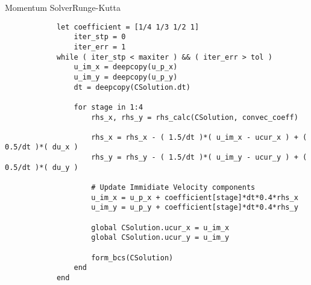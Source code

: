 \documentclass[\string~/GitHub/sthlmNordBeamerTheme/sthlmNordLightDemo.tex]{subfiles}
\begin{document}
\begin{frame}{Momentum Solver}{Runge-Kutta}

    \begin{center}
        \begin{verbatim}
            let coefficient = [1/4 1/3 1/2 1]
                iter_stp = 0
                iter_err = 1
            while ( iter_stp < maxiter ) && ( iter_err > tol )
                u_im_x = deepcopy(u_p_x)
                u_im_y = deepcopy(u_p_y)
                dt = deepcopy(CSolution.dt)

                for stage in 1:4
                    rhs_x, rhs_y = rhs_calc(CSolution, convec_coeff)

                    rhs_x = rhs_x - ( 1.5/dt )*( u_im_x - ucur_x ) + ( 0.5/dt )*( du_x )
                    rhs_y = rhs_y - ( 1.5/dt )*( u_im_y - ucur_y ) + ( 0.5/dt )*( du_y )

                    # Update Immidiate Velocity components
                    u_im_x = u_p_x + coefficient[stage]*dt*0.4*rhs_x
                    u_im_y = u_p_y + coefficient[stage]*dt*0.4*rhs_y

                    global CSolution.ucur_x = u_im_x
                    global CSolution.ucur_y = u_im_y

                    form_bcs(CSolution)
                end
            end
        \end{verbatim}
    \end{center}
    
\end{frame}
\end{document}
